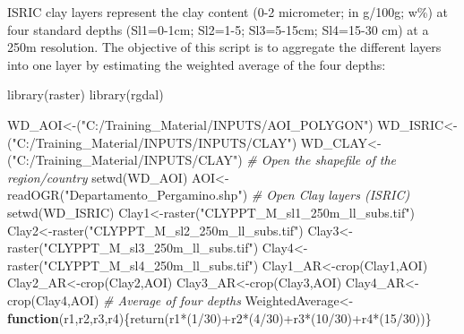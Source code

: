 \documentclass[
  10pt,
  b5paper,
]{book}
\newenvironment{Shaded}{\begin{snugshade}}{\end{snugshade}}
\newcommand{\CommentTok}[1]{\textcolor[rgb]{0.56,0.35,0.01}{\textit{#1}}}
\newcommand{\ControlFlowTok}[1]{\textcolor[rgb]{0.13,0.29,0.53}{\textbf{#1}}}
\newcommand{\DecValTok}[1]{\textcolor[rgb]{0.00,0.00,0.81}{#1}}
\newcommand{\FunctionTok}[1]{\textcolor[rgb]{0.00,0.00,0.00}{#1}}
\newcommand{\NormalTok}[1]{#1}
\newcommand{\OtherTok}[1]{\textcolor[rgb]{0.56,0.35,0.01}{#1}}
\newcommand{\SpecialCharTok}[1]{\textcolor[rgb]{0.00,0.00,0.00}{#1}}
\newcommand{\StringTok}[1]{\textcolor[rgb]{0.31,0.60,0.02}{#1}}
\begin{document}
ISRIC clay layers represent the clay content (0-2 micrometer; in g/100g; w\%) at four standard depths (Sl1=0-1cm; Sl2=1-5; Sl3=5-15cm; Sl4=15-30 cm) at a 250m resolution. The objective of this script is to aggregate the different layers into one layer by estimating the weighted average of the four depths:

\begin{Shaded}
\begin{Highlighting}[]
\FunctionTok{library}\NormalTok{(raster)}
\FunctionTok{library}\NormalTok{(rgdal)}

\NormalTok{WD\_AOI}\OtherTok{\textless{}{-}}\NormalTok{(}\StringTok{"C:/Training\_Material/INPUTS/AOI\_POLYGON"}\NormalTok{)}
\NormalTok{WD\_ISRIC}\OtherTok{\textless{}{-}}\NormalTok{(}\StringTok{"C:/Training\_Material/INPUTS/INPUTS/CLAY"}\NormalTok{)}
\NormalTok{WD\_CLAY}\OtherTok{\textless{}{-}}\NormalTok{(}\StringTok{"C:/Training\_Material/INPUTS/CLAY"}\NormalTok{)}
\CommentTok{\# Open the shapefile of the region/country}
\FunctionTok{setwd}\NormalTok{(WD\_AOI)}
\NormalTok{AOI}\OtherTok{\textless{}{-}}\FunctionTok{readOGR}\NormalTok{(}\StringTok{"Departamento\_Pergamino.shp"}\NormalTok{)}
\CommentTok{\# Open Clay layers  (ISRIC)}
\FunctionTok{setwd}\NormalTok{(WD\_ISRIC)}
\NormalTok{Clay1}\OtherTok{\textless{}{-}}\FunctionTok{raster}\NormalTok{(}\StringTok{"CLYPPT\_M\_sl1\_250m\_ll\_subs.tif"}\NormalTok{)}
\NormalTok{Clay2}\OtherTok{\textless{}{-}}\FunctionTok{raster}\NormalTok{(}\StringTok{"CLYPPT\_M\_sl2\_250m\_ll\_subs.tif"}\NormalTok{)}
\NormalTok{Clay3}\OtherTok{\textless{}{-}}\FunctionTok{raster}\NormalTok{(}\StringTok{"CLYPPT\_M\_sl3\_250m\_ll\_subs.tif"}\NormalTok{)}
\NormalTok{Clay4}\OtherTok{\textless{}{-}}\FunctionTok{raster}\NormalTok{(}\StringTok{"CLYPPT\_M\_sl4\_250m\_ll\_subs.tif"}\NormalTok{)}
\NormalTok{Clay1\_AR}\OtherTok{\textless{}{-}}\FunctionTok{crop}\NormalTok{(Clay1,AOI)}
\NormalTok{Clay2\_AR}\OtherTok{\textless{}{-}}\FunctionTok{crop}\NormalTok{(Clay2,AOI)}
\NormalTok{Clay3\_AR}\OtherTok{\textless{}{-}}\FunctionTok{crop}\NormalTok{(Clay3,AOI)}
\NormalTok{Clay4\_AR}\OtherTok{\textless{}{-}}\FunctionTok{crop}\NormalTok{(Clay4,AOI)}
\CommentTok{\# Average of four depths }
\NormalTok{WeightedAverage}\OtherTok{\textless{}{-}}\ControlFlowTok{function}\NormalTok{(r1,r2,r3,r4)\{}\FunctionTok{return}\NormalTok{(r1}\SpecialCharTok{*}\NormalTok{(}\DecValTok{1}\SpecialCharTok{/}\DecValTok{30}\NormalTok{)}\SpecialCharTok{+}\NormalTok{r2}\SpecialCharTok{*}\NormalTok{(}\DecValTok{4}\SpecialCharTok{/}\DecValTok{30}\NormalTok{)}\SpecialCharTok{+}\NormalTok{r3}\SpecialCharTok{*}\NormalTok{(}\DecValTok{10}\SpecialCharTok{/}\DecValTok{30}\NormalTok{)}\SpecialCharTok{+}\NormalTok{r4}\SpecialCharTok{*}\NormalTok{(}\DecValTok{15}\SpecialCharTok{/}\DecValTok{30}\NormalTok{))\}}

\end{Highlighting}
\end{Shaded}
\end{document}
